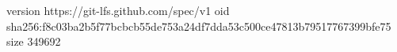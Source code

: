 version https://git-lfs.github.com/spec/v1
oid sha256:f8c03ba2b5f77bcbcb55de753a24df7dda53c500ce47813b79517767399bfe75
size 349692
